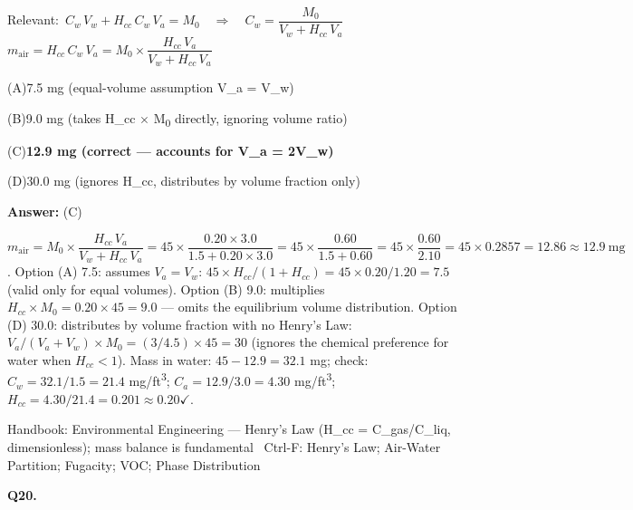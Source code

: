 \documentclass[11pt]{article}
\newcommand{\correct}[1]{\textbf{#1}\;{\color{accent}$\checkmark$}}
\newcommand{\optline}[2]{\par\noindent\hspace{1.2em}(#1)\hspace{0.6em}#2}
\begin{document}
{\small\color{soft}Relevant:}\ $C_w\,V_w + H_{cc}\,C_w\,V_a = M_0\quad\Rightarrow\quad C_w = \dfrac{M_0}{V_w + H_{cc}\,V_a}$ \quad $m_{\mathrm{air}} = H_{cc}\,C_w\,V_a = M_0\times\dfrac{H_{cc}\,V_a}{V_w + H_{cc}\,V_a}$\par\vspace{3pt}
\optline{A}{7.5 mg  (equal-volume assumption V\_a = V\_w)}
\optline{B}{9.0 mg  (takes H\_cc $\times$ M\textsubscript{0} directly, ignoring volume ratio)}
\optline{C}{\correct{12.9 mg  (correct --- accounts for V\_a = 2V\_w)}}
\optline{D}{30.0 mg  (ignores H\_cc, distributes by volume fraction only)}
\par\vspace{3pt}
\vspace{2pt}\par\noindent\colorbox{boxbg}{\parbox{\dimexpr\linewidth-2\fboxsep\relax}{%
\vspace{2pt}\textbf{Answer:} (C)\par\vspace{2pt}
{\small $m_{\mathrm{air}} = M_0\times\dfrac{H_{cc}\,V_a}{V_w + H_{cc}\,V_a} = 45\times\dfrac{0.20\times3.0}{1.5 + 0.20\times3.0} = 45\times\dfrac{0.60}{1.5+0.60} = 45\times\dfrac{0.60}{2.10} = 45\times0.2857 = 12.86\approx12.9\ \mathrm{mg}$. Option (A) 7.5: assumes $V_a = V_w$: $45\times H_{cc}/(1+H_{cc}) = 45\times0.20/1.20 = 7.5$ (valid only for equal volumes). Option (B) 9.0: multiplies $H_{cc}\times M_0 = 0.20\times45 = 9.0$ --- omits the equilibrium volume distribution. Option (D) 30.0: distributes by volume fraction with no Henry's Law: $V_a/(V_a+V_w)\times M_0 = (3/4.5)\times45 = 30$ (ignores the chemical preference for water when $H_{cc} < 1$). Mass in water: $45 - 12.9 = 32.1$ mg; check: $C_w = 32.1/1.5 = 21.4$ mg/ft\textsuperscript{3}; $C_a = 12.9/3.0 = 4.30$ mg/ft\textsuperscript{3}; $H_{cc} = 4.30/21.4 = 0.201\approx0.20$$\checkmark$.}\par\vspace{2pt}
{\footnotesize\color{soft}Handbook: Environmental Engineering --- Henry's Law (H\_cc = C\_gas/C\_liq, dimensionless); mass balance is fundamental \textbullet\ Ctrl-F: Henry's Law; Air-Water Partition; Fugacity; VOC; Phase Distribution}\vspace{2pt}
}}
\vspace{9pt}
\filbreak
\textbf{\color{accent}Q20.}\par\vspace{2pt}
\end{document}
